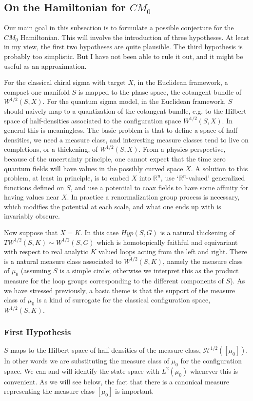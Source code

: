 \documentclass{amsart}
\theoremstyle{conjecture}
\theoremstyle{definition}
\theoremstyle{question}
\theoremstyle{questions}
\theoremstyle{remark}
\theoremstyle{remarks}
\theoremstyle{example}
\numberwithin{equation}{section}
\begin{document}
\subsection{On the Hamiltonian for $CM_0$}

Our main goal in this subsection is to formulate a possible conjecture for the $CM_0$ Hamiltonian. This will involve the introduction of three hypotheses. At least in my view, the first two hypotheses are quite plausible. The third hypothesis is probably too simplistic. But I have not been able to rule it out, and it might be useful as an approximation.

For the classical chiral sigma with target $X$, in the Euclidean framework,
a compact one manifold $S$ is mapped to the phase space, the cotangent bundle of $W^{1/2}(S,X)$. For the quantum sigma model, in the Euclidean framework, $S$ should naively map to a quantization of the cotangent bundle, e.g. to the Hilbert space of half-densities associated to the configuration space $W^{1/2}(S,X)$. In general this is meaningless.
The basic problem is that to define a space of half-densities, we need a measure class, and interesting measure classes tend to live on completions, or a thickening, of $W^{1/2}(S,X)$. From a physics perspective, because of the uncertainty principle, one cannot expect that the time zero quantum fields will have values in the possibly curved space $X$. A  solution to this problem, at least in principle, is to embed $X$ into $\mathbb R^n$, use `$\mathbb R^n$-valued' generalized functions defined on $S$, and use a potential to coax fields to have some affinity for having values near $X$. In practice a renormalization group process is necessary, which modifies the potential at each scale, and what one ends up with is invariably obscure.

Now suppose that $X=K$. In this case $Hyp(S,G)$ is a natural thickening of $TW^{1/2}(S,K)\sim W^{1/2}(S,G)$
which is homotopically faithful and equivariant with respect to real analytic $K$ valued loops acting from the left and right. There is a natural measure class associated to $W^{1/2}(S,K)$, namely the measure class of $\mu_0$ (assuming $S$ is a simple circle; otherwise we interpret this as the product measure for the loop groups corresponding to the different components of $S$). As we have stressed previously, a basic theme is that the support
of the measure class of $\mu_0$ is a kind of surrogate for the classical configuration space, $W^{1/2}(S,K)$.

\subsubsection{First Hypothesis}  $S$ maps to the Hilbert space of half-densities of the measure class, $\mathcal H^{1/2}([\mu_0])$.  In other words we are substituting the measure class of $\mu_0$ for the configuration space. We can and will identify the state space with $L^2(\mu_0)$ whenever this is convenient. As we will see below, the fact that there is a canonical measure representing the measure class $[\mu_0]$ is important.
\end{document}
